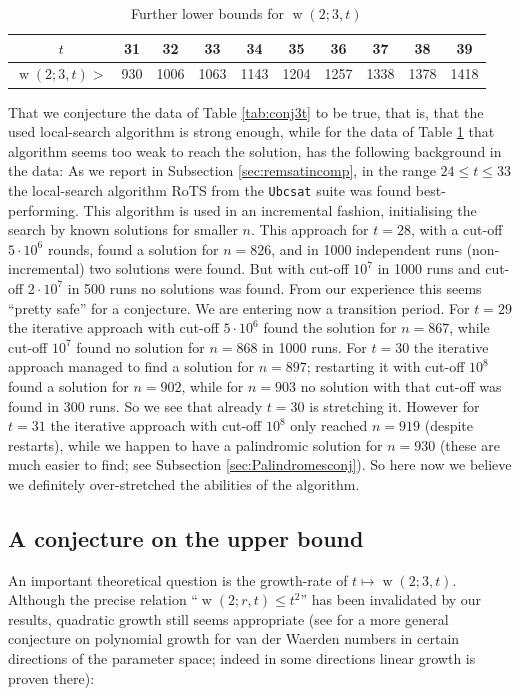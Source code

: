 \documentclass[final,3p,times]{elsarticle}
\theoremstyle{definition}
\renewcommand{\leq}{\le} %
\DeclareMathOperator{\vdw}{w}
\begin{document}
\begin{table}[H]
  \centering
  \begin{tabular}{c|*{9}{c}}
    $t$ & 31 & 32 & 33 & 34 & 35 & 36 & 37 & 38 & 39\\
    \hline
    $\vdw(2;3,t) >$ & 930 & 1006 & 1063 & 1143 & 1204 & 1257 & 1338 & 1378 & 1418
  \end{tabular}
  \caption{Further lower bounds for $\vdw(2;3,t)$}
  \label{tab:further3t}
\end{table}
That we conjecture the data of Table \ref{tab:conj3t} to be true, that is, that the used local-search algorithm is strong enough, while for the data of Table \ref{tab:further3t} that algorithm seems too weak to reach the solution, has the following background in the data: As we report in Subsection \ref{sec:remsatincomp}, in the range $24 \leq t \leq 33$ the local-search algorithm RoTS from the \texttt{Ubcsat} suite was found best-performing. This algorithm is used in an incremental fashion, initialising the search by known solutions for smaller $n$. This approach for $t=28$, with a cut-off $5 \cdot 10^6$ rounds, found a solution for $n=826$, and in 1000 independent runs (non-incremental) two solutions were found. But with cut-off $10^7$ in 1000 runs and cut-off $2 \cdot 10^7$ in 500 runs no solutions was found. From our experience this seems ``pretty safe'' for a conjecture. We are entering now a transition period. For $t=29$ the iterative approach with cut-off $5 \cdot 10^6$ found the solution for $n=867$, while cut-off $10^7$ found no solution for $n=868$ in 1000 runs. For $t=30$ the iterative approach managed to find a solution for $n=897$; restarting it with cut-off $10^8$ found a solution for $n=902$, while for $n=903$ no solution with that cut-off was found in 300 runs. So we see that already $t=30$ is stretching it. However for $t=31$ the iterative approach with cut-off $10^8$ only reached $n=919$ (despite restarts), while we happen to have a palindromic solution for $n=930$ (these are much easier to find; see Subsection \ref{sec:Palindromesconj}). So here now we believe we definitely over-stretched the abilities of the algorithm.



\subsection{A conjecture on the upper bound}
\label{sec:conjupb}

An important theoretical question is the growth-rate of $t \mapsto \vdw(2;3,t)$.
Although the precise relation ``$\vdw(2;r,t) \leq t^2$'' has been invalidated by our results,
quadratic growth still seems appropriate (see \cite{kullmann0} for a more general
conjecture on polynomial growth for van der Waerden numbers in certain directions of the parameter space; indeed in some directions linear growth is proven there):
\end{document}
